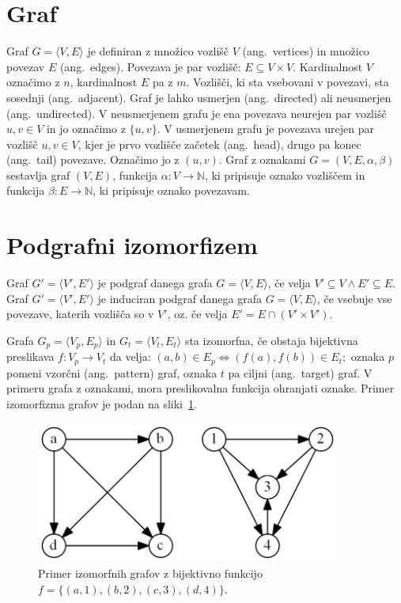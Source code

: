 \documentclass[a4paper, 12pt, ]{book}
\begin{document}
	\section{Graf}
	Graf $G = \langle V, E \rangle$ je definiran z množico vozlišč $V$ (ang.~vertices) in množico povezav $E$ (ang.~edges). Povezava je par vozlišč: 
	$E \subseteq V \times V$. Kardinalnost $V$ označimo z $n$, kardinalnost $E$ pa z $m$.
	Vozlišči, ki sta vsebovani v povezavi, sta sosednji (ang.~adjacent). Graf je lahko usmerjen (ang.~directed) ali neusmerjen
	(ang.~undirected). V neusmerjenem
	grafu je ena povezava neurejen par vozlišč $u, v \in V$ in jo označimo z $\{u, v\}$. V usmerjenem grafu je povezava urejen par 
	vozlišč $u, v \in V$, kjer je prvo vozlišče začetek (ang.~head), drugo pa konec (ang.~tail) povezave. Označimo jo z $(u, v)$.
	Graf z oznakami $G = (V, E, \alpha, \beta)$ sestavlja graf $(V, E)$, funkcija $\alpha: V \to \mathbb{N} $, ki pripisuje oznako
	vozliščem in funkcija $\beta: E \rightarrow \mathbb{N}$, ki pripisuje oznako povezavam.



	\section{Podgrafni izomorfizem}
	Graf $G' = \langle V', E' \rangle$ je podgraf danega grafa $G = \langle V, E \rangle$, če velja $V' \subseteq V \wedge E' \subseteq E$. 
	Graf $G' = \langle V', E' \rangle$ je induciran podgraf danega grafa $G = \langle V, E \rangle$, če vsebuje vse povezave, katerih vozlišča so
	v $V'$, oz. če velja $E' = E \cap (V' \times V')$.

	Grafa $G_p = \langle V_p, E_p \rangle $ in $G_t = \langle V_t, E_t \rangle$ sta izomorfna, če obstaja bijektivna preslikava $f: V_p \to V_t$ da velja: 
	$(a,b) \in E_p \Leftrightarrow (f(a), f(b)) \in E_t;$
	oznaka $p$ pomeni vzorčni (ang.~pattern) graf, oznaka $t$ pa ciljni (ang.~target) graf. V primeru grafa z oznakami, mora preslikovalna funkcija
	ohranjati oznake. Primer izomorfizma grafov je podan na sliki~\ref{pic_iso}.

	\begin{figure}
	\begin{center}
	\includegraphics[width=10cm]{img/graph_izomorph.png}
	\end{center}
	\caption{Primer izomorfnih grafov z bijektivno funkcijo $f = \{(a, 1), (b, 2), (c, 3), (d, 4)\}$.}
	\label{pic_iso}
	\end{figure}
\end{document}
